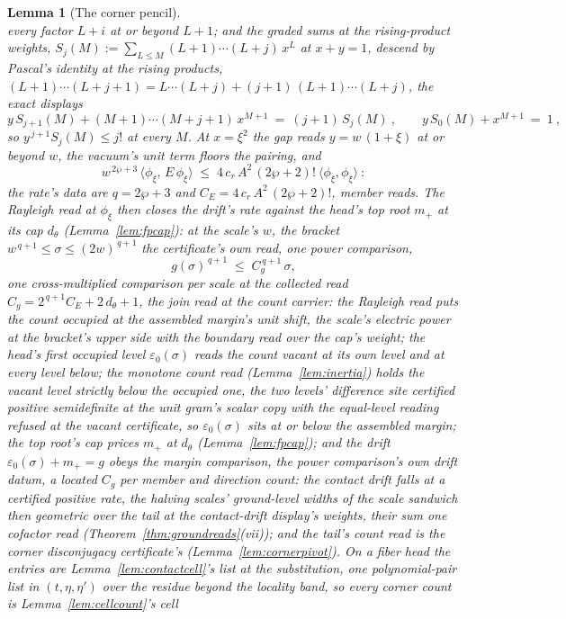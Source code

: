 \documentclass[11pt]{article}
\newtheorem{lemma}{Lemma}
\theoremstyle{definition}
\begin{document}
\begin{lemma}[The corner pencil]
\[\]
every factor $L+i$ at or beyond $L+1$; and the graded sums at the
rising-product weights,
$S_j(M):=\sum_{L\le M}(L+1)\cdots(L+j)\,x^{L}$ at $x+y=1$, descend
by Pascal's identity at the rising products,
$(L+1)\cdots(L+j+1)=L\cdots(L+j)+(j+1)\,(L+1)\cdots(L+j)$, the
exact displays
\[
y\,S_{j+1}(M)+(M+1)\cdots(M+j+1)\,x^{M+1}\ =\ (j+1)\,S_j(M)\ ,
\qquad
y\,S_0(M)+x^{M+1}\ =\ 1\ ,
\]
so $y^{\,j+1}S_j(M)\le j!$ at every $M$. At $x=\xi^{2}$ the gap reads
$y=w\,(1+\xi)$ at or beyond $w$, the vacuum's unit term floors the
pairing, and
\[
w^{\,2\wp+3}\,\langle\phi_\xi,\,E\,\phi_\xi\rangle
\;\le\;4\,c_r\,A^2\,(2\wp+2)!\ \langle\phi_\xi,\phi_\xi\rangle\ :
\]
the rate's data are $q=2\wp+3$ and $C_E=4\,c_r\,A^2\,(2\wp+2)!$,
member reads.
The Rayleigh read at $\phi_\xi$ then closes the drift's rate
against the head's top root $m_+$ at its cap $d_\theta$
(Lemma~\ref{lem:fpcap}): at the scale's $w$, the bracket
$w^{\,q+1}\le\sigma\le(2w)^{\,q+1}$ the certificate's own read,
one power comparison,
\[
g(\sigma)^{\,q+1}\;\le\;C_g^{\,q+1}\,\sigma ,
\]
one cross-multiplied comparison per scale at the collected read
$C_g=2^{\,q+1}C_E+2\,d_\theta+1$, the join read at the count
carrier: the Rayleigh read puts the count occupied at the
assembled margin's unit shift, the scale's electric power at the
bracket's upper side with the boundary read over the cap's weight;
the head's first occupied level $\varepsilon_0(\sigma)$ reads the
count vacant at its own level and at every level below; the
monotone count read (Lemma~\ref{lem:inertia}) holds the vacant
level strictly below the occupied one, the two levels' difference
site certified positive semidefinite at the unit gram's scalar
copy with the equal-level reading refused at the vacant
certificate, so $\varepsilon_0(\sigma)$ sits at or below the
assembled margin; the top root's cap prices $m_+$ at $d_\theta$
(Lemma~\ref{lem:fpcap}); and the drift
$\varepsilon_0(\sigma)+m_+=g$ obeys the margin comparison, the
power comparison's own drift datum, a located
$C_g$ per member and direction count: the contact drift falls at a
certified positive rate, the halving scales' ground-level widths
of the scale sandwich then geometric over the tail at the
contact-drift display's weights, their sum one cofactor read
(Theorem~\ref{thm:groundreads}(vii)); and the tail's count read is the
corner disconjugacy certificate's
(Lemma~\ref{lem:cornerpivot}). On a fiber
head the entries are Lemma~\ref{lem:contactcell}'s list at the
substitution, one polynomial-pair list in $(t,\eta,\eta')$ over the
residue beyond the locality
band, so every corner count is Lemma~\ref{lem:cellcount}'s cell

\end{lemma}
\end{document}
